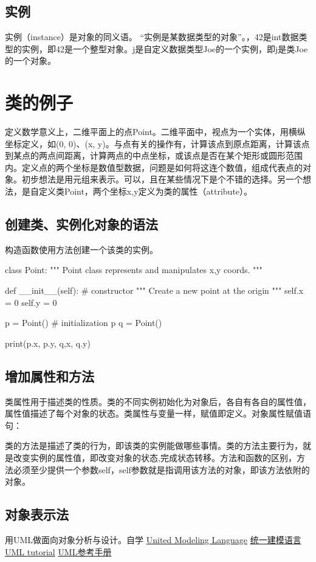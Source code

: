 \subsection{实例}
实例（instance）是对象的同义语。 “实例是某数据类型的对象”。，42是int数据类型的实例，即42是一个整型对象。j是自定义数据类型Joe的一个实例，即j是类Joe的一个对象。

\section{类的例子}
定义数学意义上，二维平面上的点Point。二维平面中，视点为一个实体，用横纵坐标定义，如(0, 0)、(x, y)。与点有关的操作有，计算该点到原点距离，计算该点到某点的两点间距离，计算两点的中点坐标，或该点是否在某个矩形或圆形范围内。定义点的两个坐标是数值型数据，问题是如何将这连个数值，组成代表点的对象。初步想法是用元组来表示。可以，且在某些情况下是个不错的选择。另一个想法，是自定义类Point，两个坐标x,y定义为类的属性（attribute）。
\subsection{创建类、实例化对象的语法}
构造函数使用方法创建一个该类的实例。
\begin{python}
class Point:
    """ Point class represents and manipulates x,y coords. """

    def __init__(self):    #  constructor
        """ Create a new point at the origin """
        self.x = 0
        self.y = 0

p = Point()  # initialization p
q = Point()   

print(p.x, p.y, q,x, q.y)
\end{python}
\subsection{增加属性和方法}
类属性用于描述类的性质。类的不同实例初始化为对象后，各自有各自的属性值，属性值描述了每个对象的状态。类属性与变量一样，赋值即定义。对象属性赋值语句：


类的方法是描述了类的行为，即该类的实例能做哪些事情。类的方法主要行为，就是改变实例的属性值，即改变对象的状态,完成状态转移。方法和函数的区别，方法必须至少提供一个参数self，self参数就是指调用该方法的对象，即该方法依附的对象。


\subsection{对象表示法}
用UML做面向对象分析与设计。自学
\href{https://en.wikipedia.org/wiki/Unified_Modeling_Language}{United Modeling Language}
\href{http://www.uml.org/what-is-uml.htm}{统一建模语言}
\href{https://www.w3cschool.cn/uml_tutorial}{UML tutorial}
\href{file:./misc/UML_Tutorial.pdf}{UML参考手册}
